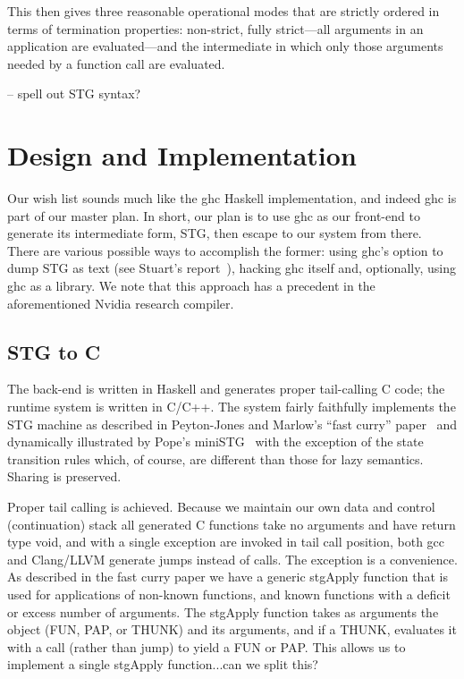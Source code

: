 \documentclass{llncs}
\begin{document}
This then gives three reasonable operational modes that are strictly ordered
in terms of termination properties: non-strict, fully strict---all arguments
in an application are evaluated---and the intermediate in which only those
arguments needed by a function call are evaluated.



-- spell out STG syntax?

\section{Design and Implementation}

Our wish list sounds much like the ghc Haskell implementation, and indeed ghc
is part of our master plan.  In short, our plan is to use ghc as our front-end
to generate its intermediate form, STG, then escape to our system from there.
There are various possible ways to accomplish the former: using ghc's option
to dump STG as text (see Stuart's report~\cite{Stuart}), hacking ghc itself
and, optionally, using ghc as a library.  We note that this approach has 
a precedent in the aforementioned Nvidia research compiler.

\subsection{STG to C}

The back-end is written in Haskell and generates proper tail-calling C code;
the runtime system is written in C/C++.  The system fairly faithfully
implements the STG machine as described in Peyton-Jones and Marlow's ``fast
curry'' paper~\cite{fastcurry} and dynamically illustrated by Pope's
miniSTG~\cite{ministg} with the exception of the state transition rules which,
of course, are different than those for lazy semantics.  Sharing is preserved.

Proper tail calling is achieved.  Because we maintain our own data and control
(continuation) stack all generated C functions take no arguments and have return
type void, and with a single exception are invoked in tail call position, both
gcc and Clang/LLVM generate jumps instead of calls.  The exception is a convenience.
As described in the fast curry paper we have a generic stgApply function that
is used for applications of non-known functions, and known functions with
a deficit or excess number of arguments.  The stgApply function takes as arguments
the object (FUN, PAP, or THUNK) and its arguments, and if a THUNK, evaluates it
with a call (rather than jump) to yield a FUN or PAP.  This allows us to implement
a single stgApply function...can we split this?
\end{document}
